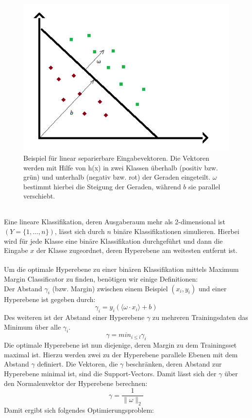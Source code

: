 \begin{figure}[hbtp]
\includegraphics[width=0.7\linewidth]{LinSeparabel.png}
\centering
\caption{Beispiel für linear separierbare Eingabevektoren. Die Vektoren werden mit Hilfe von h(x) in zwei Klassen überhalb (positiv bzw. grün) und unterhalb (negativ bzw. rot) der Geraden eingeteilt. $\omega$ bestimmt hierbei die Steigung der Geraden, während $b$ sie parallel verschiebt.}
\label{fig:LinSeparabel}
\end{figure}\ \\
Eine lineare Klassifikation, deren Ausgaberaum mehr als 2-dimensional ist $(Y = \{1,...,n\})$, lässt sich durch $n$ binäre Klassifikationen simulieren. Hierbei wird für jede Klasse eine binäre Klassifikation durchgeführt und dann die Eingabe $x$ der Klasse zugeordnet, deren Hyperebene am weitesten entfernt ist.\\ \\
Um die optimale Hyperebene zu einer binären Klassifikation mittels \glqq{}Maximum Margin Classificator\grqq{} zu finden, benötigen wir einige Definitionen: \\
 Der Abstand $\gamma_{i}$ (bzw. Margin) zwischen einem Beispiel $(x_{i},y_{i})$ und einer Hyperebene ist gegeben durch:
\[ \gamma_{i} = y_{i}(\langle \omega \cdot x_{i} \rangle + b )\]
Des weiteren ist der Abstand einer Hyperebene $\gamma$ zu mehreren Trainingsdaten das Minimum über alle $\gamma_{i}$.
\[\gamma = min_{i\leq l} \gamma_{i}\]
Die optimale Hyperebene ist nun diejenige, deren Margin zu dem Trainingsset maximal ist. Hierzu werden zwei zu der Hyperebene parallele Ebenen mit dem Abstand $\gamma$ definiert. Die Vektoren, die $\gamma$ beschränken, deren Abstand zur Hyperebene minimal ist, sind die \glqq{}Support-Vectors\grqq{}. Damit lässt sich der $\gamma$ über den Normalenvektor der Hyperebene berechnen:
\[\gamma = \frac{1}{\lVert \omega \rVert_{2}} \]
Damit ergibt sich folgendes Optimierungsproblem:\\

